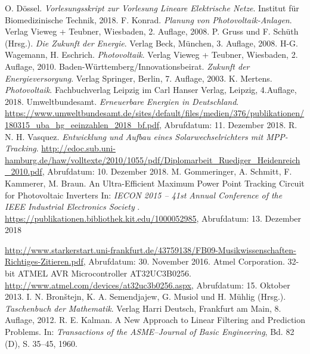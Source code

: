 \begin{thebibliography}{99}
	 O. Dössel. {\itshape Vorlesungsskript zur Vorlesung Lineare Elektrische Netze}. Institut für Biomedizinische Technik, 2018. F. Konrad. {\itshape Planung von Photovoltaik-Anlagen}. Verlag Vieweg + Teubner, Wiesbaden, 2. Auflage, 2008.
	 P. Gruss und F. Schüth (Hrsg.). {\itshape Die Zukunft der Energie}. Verlag Beck, München, 3. Auflage, 2008.
	 H-G. Wagemann, H. Eschrich. {\itshape Photovoltaik}. Verlag Vieweg + Teubner, Wiesbaden, 2. Auflage, 2010.
	 Baden-Württemberg/Innovationsbeirat. {\itshape Zukunft der Energieversorgung}. Verlag Springer, Berlin, 7. Auflage, 2003.
	 K. Mertens. {\itshape Photovoltaik}. Fachbuchverlag Leipzig im Carl Hanser Verlag, Leipzig, 4.Auflage, 2018.
	 Umweltbundesamt. {\itshape Erneuerbare Energien in Deutschland}. \url{https://www.umweltbundesamt.de/sites/default/files/medien/376/publikationen/180315_uba_hg_eeinzahlen_2018_bf.pdf}, Abrufdatum: 11. Dezember 2018.
	 R. N. H. Vasquez. {\itshape Entwicklung und Aufbau eines Solarwechselrichters mit MPP-Tracking}. \url{http://edoc.sub.uni-hamburg.de/haw/volltexte/2010/1055/pdf/Diplomarbeit_Ruediger_Heidenreich_2010.pdf}, Abrufdatum: 10. Dezember 2018.
	 M. Gommeringer, A. Schmitt, F. Kammerer, M. Braun. An Ultra-Efficient Maximum Power Point Tracking Circuit for Photovoltaic Inverters In: {\itshape IECON 2015 – 41st Annual Conference of the IEEE Industrial Electronics Society }. \url{https://publikationen.bibliothek.kit.edu/1000052985}, Abrufdatum: 13. Dezember 2018


	
	 \url{http://www.starkerstart.uni-frankfurt.de/43759138/FB09-Musikwissenschaften-Richtiges-Zitieren.pdf}, Abrufdatum: 30. November 2016.
	 Atmel Corporation. 32-bit ATMEL AVR Microcontroller AT32UC3B0256. \url{http://www.atmel.com/devices/at32uc3b0256.aspx}, Abrufdatum: 15. Oktober 2013.
	 I. N. Bron\v{s}tejn, K. A. Semendjajew, G. Musiol und H. Mühlig (Hrsg.). {\itshape Taschenbuch der Mathematik}. Verlag Harri Deutsch, Frankfurt am Main, 8. Auflage, 2012.
	 R. E. Kalman. A New Approach to Linear Filtering and Prediction Problems. In: {\itshape Transactions of the ASME--Journal of Basic Engineering}, Bd. 82 (D), S. 35--45, 1960.
	
\end{thebibliography}